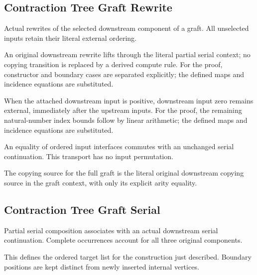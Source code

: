 \subsection{Contraction Tree Graft Rewrite}
Actual rewrites of the selected downstream component of a graft. All unselected inputs retain their literal external ordering.

An original downstream rewrite lifts through the literal partial serial context; no copying transition is replaced by a derived compute rule.
For the proof, constructor and boundary cases are separated explicitly; the defined maps and incidence equations are substituted.
\par{}

When the attached downstream input is positive, downstream input zero remains external, immediately after the upstream inputs.
For the proof, the remaining natural-number index bounds follow by linear arithmetic; the defined maps and incidence equations are substituted.
\par{}

An equality of ordered input interfaces commutes with an unchanged serial continuation. This transport has no input permutation.
\par{}

The copying source for the full graft is the literal original downstream copying source in the graft context, with only its explicit arity equality.
\par{}

\subsection{Contraction Tree Graft Serial}
Partial serial composition associates with an actual downstream serial continuation. Complete occurrences account for all three original components.

This defines the ordered target list for the construction just described. Boundary positions are kept distinct from newly inserted internal vertices.
\par{}


